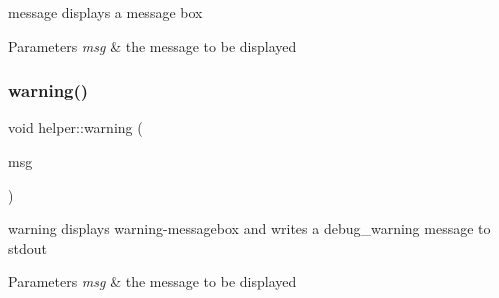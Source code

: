 message displays a message box 


\begin{DoxyParams}{Parameters}
{\em msg} & the message to be displayed \\
\hline
\end{DoxyParams}
\mbox{\label{namespacehelper_ac717f710dcb45bf31fba9071ea4fb45f}} 
\subsubsection{\texorpdfstring{warning()}{warning()}}
{\footnotesize\ttfamily void helper\+::warning (\begin{DoxyParamCaption}\item[{Q\+String}]{msg }\end{DoxyParamCaption})}



warning displays warning-\/messagebox and writes a debug\+\_\+warning message to stdout 


\begin{DoxyParams}{Parameters}
{\em msg} & the message to be displayed \\
\hline
\end{DoxyParams}

